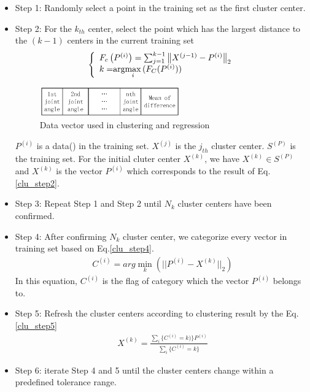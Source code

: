 \begin{itemize}
	\item Step 1: Randomly select a point in the training set as the first cluster center.
	\item Step 2: For the $k_{th}$ center, select the point which has the largest  distance to the $(k-1)$ centers in the current training set
	\begin{eqnarray}\label{clu_step2}
	\left\{
	\begin{array}{lr}
	F_{c}\left ( P^{\left (  i\right )} \right ) = \sum_{j=1}^{k-1}\left \| X^{\left ( j-1 \right )}-P^{\left (  i\right )} \right \|_{2}\\
	k = $arg$\max \limits_{i}{(F_{C}(P^{(i)}))}
	\end{array}
	\right.
	\end{eqnarray}
	\begin{figure}[H]
		\centering
		\includegraphics[height=0.5in]{fig/mainwork/data2}
		\caption{Data vector used in clustering and regression}
	\end{figure}
	$P^{(i)}$ is a data() in the training set. $X^{(j)}$ is the $j_{th}$ cluster center. $S^{(P)}$ is the  training set. For the initial cluter center $X^{(k)}$, we have $X^{(k)}\in S^{(P)}$ and $X^{(k)}$ is the vector $P^{(i)}$ which corresponds to the result of Eq.\ref{clu_step2}. 
	\item Step 3: Repeat Step 1 and Step 2 until $N_{k}$ cluster centers have been confirmed.
	\item Step 4: After confirming $N_{k}$ cluster center, we categorize every vector in training set based on Eq.\ref{clu_step4}.
	\begin{eqnarray}\label{clu_step4}
	C^{(i)} = arg\min \limits_{k}{(||P^{(i)}-X^{(k)}||_{2})}
	\end{eqnarray}
	In this equation, $C^{(i)}$ is the flag of category which the vector $P^{(i)}$ belongs to.
	\item Step 5: Refresh the cluster centers according to clustering result by the Eq.\ref{clu_step5}
	\begin{eqnarray}\label{clu_step5}
	X^{(k)}=\frac{\sum_{i}\{C^{(i)}=k)\}P^{(i)}}{\sum_{i}\{C^{(i)}=k\}}
	\end{eqnarray}
	\item Step 6: iterate Step 4 and 5 until the cluster centers change within a predefined tolerance range.
\end{itemize}

